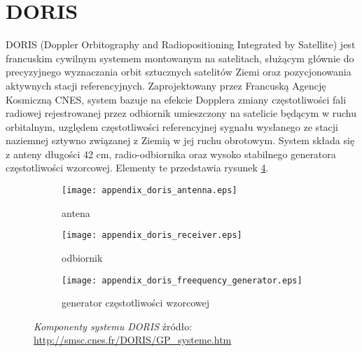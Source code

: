 \section{DORIS}
\noindent DORIS (Doppler Orbitography and Radiopositioning Integrated by Satellite) jest francuskim cywilnym systemem montowanym 
na satelitach, służącym głównie do precyzyjnego wyznaczania orbit sztucznych satelitów Ziemi oraz pozycjonowania aktywnych stacji referencyjnych.
Zaprojektowany przez Francuską Agencję Kosmiczną CNES, system bazuje na efekcie Dopplera zmiany częstotliwości fali radiowej rejestrowanej przez odbiornik 
umieszczony na satelicie będącym w ruchu orbitalnym, uzględem częstotliwości referencyjnej sygnału wysłanego ze stacji naziemnej sztywno związanej z Ziemią
 w jej ruchu obrotowym. \cite[]{DORIS_AVISO} System składa się z anteny długości 42 cm, radio-odbiornika oraz wysoko stabilnego generatora częstotliwości wzorcowej. 
Elementy te przedstawia rysunek \ref{fig:DORIS_equipment}.
\begin{figure}[H]
\centering
\begin{subfigure}{.33\textwidth}
  \centering
  \texttt{[image: appendix\_doris\_antenna.eps]}
  \caption{antena}
  \label{fig:DORIS_eq_sub1}
\end{subfigure}%
\begin{subfigure}{.3\textwidth}
  \centering
  \texttt{[image: appendix\_doris\_receiver.eps]}
  \caption{odbiornik}
  \label{fig:DORIS_eq_sub2}
\end{subfigure}
\begin{subfigure}{.3\textwidth}
	\centering
	\texttt{[image: appendix\_doris\_freequency\_generator.eps]}
	\caption{generator częstotliwości wzorcowej}
	\label{fig:DORIS_eq_sub3}
\end{subfigure}
\caption{\textit{Komponenty systemu DORIS}
źródło: \protect\url{http://smsc.cnes.fr/DORIS/GP_systeme.htm}}
\label{fig:DORIS_equipment}
\end{figure}


